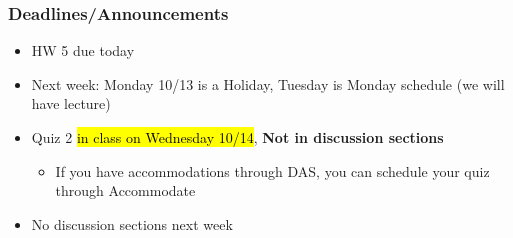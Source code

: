 
\begin{frame}
    \frametitle{Deadlines/Announcements}
\begin{itemize}
            \item HW 5 due today
            \item Next week: Monday 10/13 is a Holiday, Tuesday is Monday schedule (we will have lecture)
            \item Quiz 2 \hl{in class on Wednesday 10/14}, \textbf{Not in discussion sections}
            \begin{itemize}
                \item If you have accommodations through DAS, you can schedule your quiz through Accommodate
            \end{itemize}
            \item No discussion sections next week
        \end{itemize}
\end{frame}
